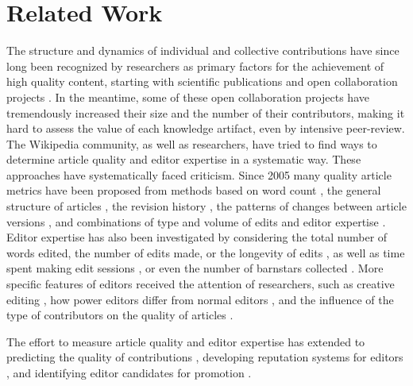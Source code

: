 \section{Related Work}
The structure and dynamics of individual and collective contributions have since long been recognized by researchers as primary factors for the achievement of high quality content, starting with scientific publications \cite{newman2001} and open collaboration projects \cite{bryant2005}. In the meantime, some of these open collaboration projects have tremendously increased their size and the number of their contributors, making it hard to assess the value of each knowledge artifact, even by intensive peer-review. The Wikipedia community, as well as researchers, have tried to find ways to determine article quality and editor expertise in a systematic way. These approaches have systematically faced criticism. Since 2005 many quality article metrics have been proposed from methods based on word count \cite{blumenstock2008sizematters}, the general structure of articles \cite{wang2013tell}, the revision history \cite{hu2007articlequality}, the patterns of changes between article versions \cite{woehner2009}, and combinations of type and volume of edits and editor expertise \cite{kane2011}. Editor expertise has also been investigated by considering the total number of words edited, the number of edits made, or the longevity of edits \cite{adler2008measuringauthor}, as well as time spent making edit sessions \cite{geiger2013}, or even the number of barnstars collected \cite{Kriplean2008}. More specific features of editors received the attention of researchers, such as creative editing \cite{iba2010}, how power editors differ from normal editors \cite{panciera2009}, and the influence of the type of contributors on the quality of articles \cite{stein2007}.

The effort to measure article quality and editor expertise has extended to predicting the quality of contributions \cite{druck2008learning,zeng2006computingtrust}, developing reputation systems for editors \cite{adler2007contentdriven}, and identifying editor candidates for promotion \cite{burke2008taking}.


